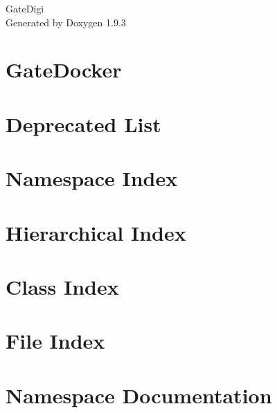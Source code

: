 \documentclass[twoside]{book}
\newcommand{\+}{\discretionary{\mbox{\scriptsize$\hookleftarrow$}}{}{}}
\newcommand{\clearemptydoublepage}{%
    \newpage{\pagestyle{empty}\cleardoublepage}%
  }
\begin{document}
  \raggedbottom
    \hypersetup{pageanchor=false,
                bookmarksnumbered=true,
                pdfencoding=unicode
               }
  \begin{titlepage}
  \vspace*{7cm}
  \begin{center}%
  {\Large Gate\+Digi}\\
  \vspace*{1cm}
  {\large Generated by Doxygen 1.9.3}\\
  \end{center}
  \end{titlepage}
  \clearemptydoublepage
  \tableofcontents
  \clearemptydoublepage
  \hypersetup{pageanchor=true}
\chapter{Gate\+Docker}
\label{md__biomaps_physique_appli_GateOlga_src_source_docker_README}

\chapter{Deprecated List}
\label{deprecated}

\chapter{Namespace Index}

\chapter{Hierarchical Index}

\chapter{Class Index}

\chapter{File Index}

\chapter{Namespace Documentation}






\end{document}
